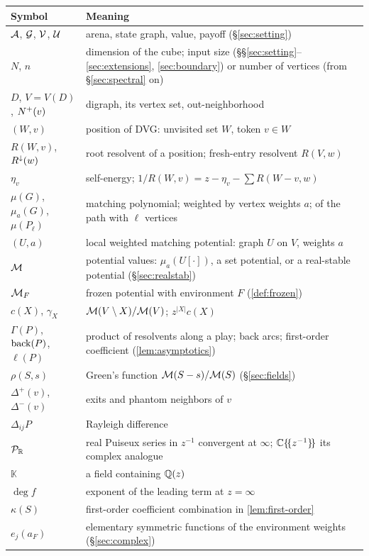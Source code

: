 \begin{center}\small
\begin{longtable}{@{}L{0.25}L{0.71}@{}}
\toprule
Symbol & Meaning\\ \midrule\endhead
$\arena$, $\SG$, $\val$, $\pay$ & arena, state graph, value, payoff (\S\ref{sec:setting})\\
$N$, $n$ & dimension of the cube; input size (\S\S\ref{sec:setting}--\ref{sec:extensions}, \ref{sec:boundary}) or number of vertices (from \S\ref{sec:spectral} on)\\
$D$, $V=V(D)$, $\nplus(v)$ & digraph, its vertex set, out-neighborhood\\
$(W,v)$ & position of DVG: unvisited set $W$, token $v\in W$\\
$R(W,v)$, $\Rdown(w)$ & root resolvent of a position; fresh-entry resolvent $R(V,w)$\\
$\eta_v$ & self-energy; $1/R(W,v)=z-\eta_v-\sum R(W-v,w)$\\
$\mu(G)$, $\mu_a(G)$, $\mu(P_\ell)$ & matching polynomial; weighted by vertex weights $a$; of the path with $\ell$ vertices\\
$(U,a)$ & local weighted matching potential: graph $U$ on $V$, weights $a$\\
$\Mpot$ & potential values: $\mu_a(U[\cdot])$, a set potential, or a real-stable potential (\S\ref{sec:realstab})\\
$\Mpot_F$ & frozen potential with environment $F$ (\cref{def:frozen})\\
$c(X)$, $\gamma_X$ & $\Mpot(V\setminus X)/\Mpot(V)$; $z^{|X|}c(X)$\\
$\Gamma(P)$, $\back(P)$, $\ell(P)$ & product of resolvents along a play; back arcs; first-order coefficient (\cref{lem:asymptotics})\\
$\rho(S,s)$ & Green's function $\Mpot(S-s)/\Mpot(S)$ (\S\ref{sec:fields})\\
$\Delta^{+}(v)$, $\Delta^{-}(v)$ & exits and phantom neighbors of $v$\\
$\Delta_{ij}P$ & Rayleigh difference\\
$\Puis$ & real Puiseux series in $z^{-1}$ convergent at $\infty$; $\CC\{\!\{z^{-1}\}\!\}$ its complex analogue\\
$\mathbb K$ & a field containing $\Qz$\\
$\deg f$ & exponent of the leading term at $z=\infty$\\
$\kappa(S)$ & first-order coefficient combination in \cref{lem:first-order}\\
$e_j(a_F)$ & elementary symmetric functions of the environment weights (\S\ref{sec:complex})\\

\end{longtable}
\end{center}
